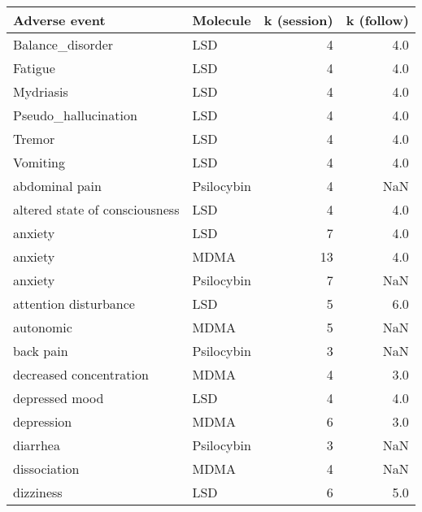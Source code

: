 \begin{tabular}{llrr}
\toprule
                      Adverse event &   Molecule &  k (session) &  k (follow) \\
\midrule
                   Balance_disorder &        LSD &            4 &         4.0 \\
                            Fatigue &        LSD &            4 &         4.0 \\
                          Mydriasis &        LSD &            4 &         4.0 \\
               Pseudo_hallucination &        LSD &            4 &         4.0 \\
                             Tremor &        LSD &            4 &         4.0 \\
                           Vomiting &        LSD &            4 &         4.0 \\
                     abdominal pain & Psilocybin &            4 &         NaN \\
     altered state of consciousness &        LSD &            4 &         4.0 \\
                            anxiety &        LSD &            7 &         4.0 \\
                            anxiety &       MDMA &           13 &         4.0 \\
                            anxiety & Psilocybin &            7 &         NaN \\
              attention disturbance &        LSD &            5 &         6.0 \\
                          autonomic &       MDMA &            5 &         NaN \\
                          back pain & Psilocybin &            3 &         NaN \\
            decreased concentration &       MDMA &            4 &         3.0 \\
                     depressed mood &        LSD &            4 &         4.0 \\
                         depression &       MDMA &            6 &         3.0 \\
                           diarrhea & Psilocybin &            3 &         NaN \\
                       dissociation &       MDMA &            4 &         NaN \\
                          dizziness &        LSD &            6 &         5.0 \\

\end{tabular}
